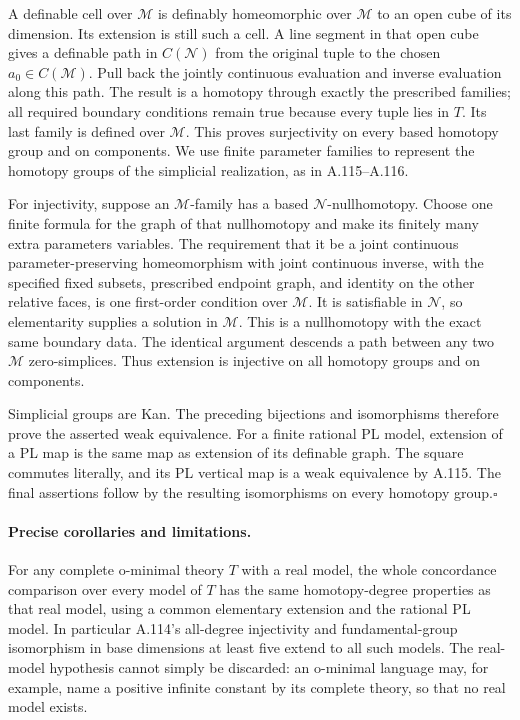 A definable cell over $\mathcal M$ is definably homeomorphic over
$\mathcal M$ to an open cube of its dimension. Its extension is still
such a cell. A line segment in that open cube gives a definable path
in $C(\mathcal N)$ from the original tuple to the chosen
$a_0\in C(\mathcal M)$. Pull back the jointly continuous evaluation
and inverse evaluation along this path. The result is a homotopy
through exactly the prescribed families; all required boundary
conditions remain true because every tuple lies in $T$.
Its last family is defined over $\mathcal M$.
This proves surjectivity on every based homotopy group and on
components. We use finite parameter families to represent the
homotopy groups of the simplicial realization, as in A.115--A.116.

For injectivity, suppose an $\mathcal M$-family has a based
$\mathcal N$-nullhomotopy. Choose one finite formula for the graph
of that nullhomotopy and make its finitely many extra parameters
variables. The requirement that it be a joint continuous
parameter-preserving homeomorphism with joint continuous inverse,
with the specified fixed subsets, prescribed endpoint graph, and
identity on the other relative faces, is one first-order condition
over $\mathcal M$. It is satisfiable in $\mathcal N$, so
elementarity supplies a solution in $\mathcal M$. This is a
nullhomotopy with the exact same boundary data. The identical
argument descends a path between any two $\mathcal M$ zero-simplices.
Thus extension is injective on all homotopy groups and on components.

Simplicial groups are Kan. The preceding bijections and isomorphisms
therefore prove the asserted weak equivalence. For a finite rational
PL model, extension of a PL map is the same map as extension of its
definable graph. The square commutes literally, and its PL vertical
map is a weak equivalence by A.115. The final assertions follow by
the resulting isomorphisms on every homotopy group.\hfill$\square$

\paragraph{Precise corollaries and limitations.}
For any complete o-minimal theory $T$ with a real model, the whole
concordance comparison over every model of $T$ has the same
homotopy-degree properties as that real model, using a common
elementary extension and the rational PL model. In particular A.114's
all-degree injectivity and fundamental-group isomorphism in base
dimensions at least five extend to all such models. The real-model
hypothesis cannot simply be discarded: an o-minimal language may,
for example, name a positive infinite constant by its complete
theory, so that no real model exists.

